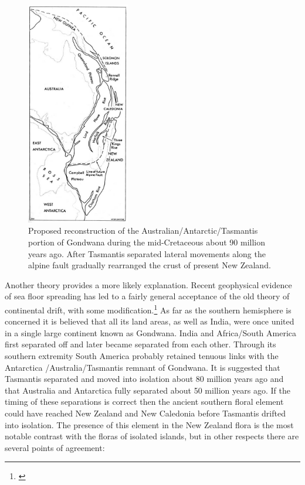 \begin{figure}
	\includegraphics[width=0.4\textwidth]{graphics/figure3gondwana.jpg}
	\centering
	\caption[Proposed reconstruction of the Australian/Antarctic/Tasmantis portion of Gondwana]{Proposed reconstruction of the Australian/Antarctic/Tasmantis portion of Gondwana during the mid-Cretaceous about 90 million years ago.
After Tasmantis separated lateral movements along the alpine fault gradually rearranged the crust of present New Zealand.}
	\label{fig:3gondwana}
\end{figure}

Another theory provides a more likely explanation.
Recent geophysical evidence of sea floor spreading has led to a fairly general acceptance of the old theory of continental drift, with some modification.\footnote{\cite{stevens1980new}}
As far as the southern hemisphere is concerned it is believed that all its land areas, as well as India, were once united in a single large continent known as Gondwana.
India and Africa/South America first separated off and later became separated from each other.
Through its southern extremity South America probably retained tenuous links with the Antarctica /Australia/Tasmantis remnant of Gondwana.
It is suggested that Tasmantis separated and moved into isolation about 80 million years ago and that Australia and Antarctica fully separated about 50 million years ago.
If the timing of these separations is correct then the ancient southern floral element could have reached New Zealand and New Caledonia before Tasmantis drifted into isolation.
The presence of this element in the New Zealand flora is the most notable contrast with the floras of isolated islands, but in other respects there are several points of agreement:

